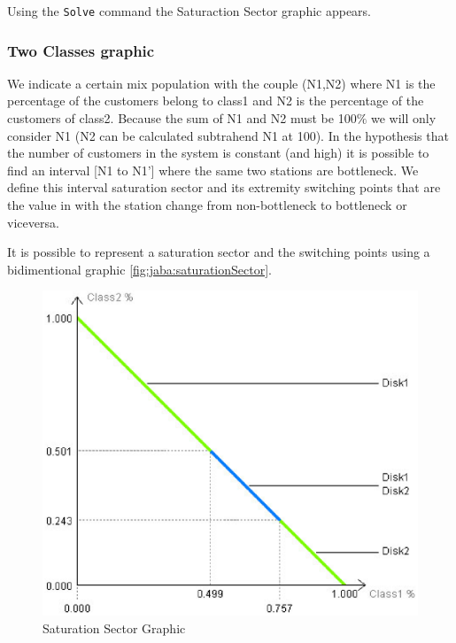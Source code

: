 Using the \texttt{Solve} command the Saturaction Sector graphic appears.

\subsubsection{Two Classes graphic}

We indicate a certain mix population with the couple (N1,N2) where N1 is the percentage of the customers belong to class1 and N2 is the percentage of the customers of class2. Because the sum of N1 and N2 must be 100$\%$ we will only consider N1 (N2 can be calculated subtrahend N1 at 100). In the hypothesis that the number of customers in the system is constant (and high) it is possible to find an interval [N1 to N1'] where the same two stations are bottleneck.
We define this interval saturation sector and its extremity switching points that are the value in with the station change from non-bottleneck to bottleneck or viceversa.

It is possible to represent a saturation sector and the switching points using a bidimentional graphic \autoref{fig:jaba:saturationSector}.
\begin{figure}[htbp]
    \begin{center}
        \includegraphics[scale=.5]{img/jaba/saturationSector}
    \end{center}
    \caption{Saturation Sector Graphic}
    \label{fig:jaba:saturationSector}
\end{figure}


